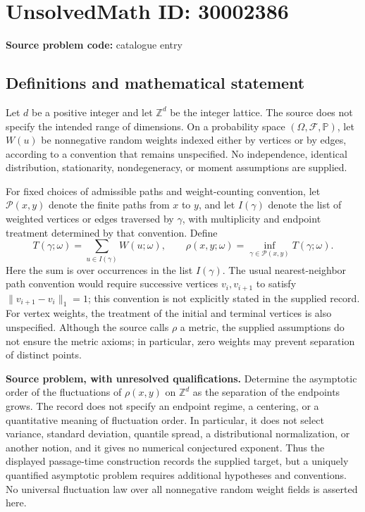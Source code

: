\documentclass[11pt]{article}
\newcommand{\Z}{\mathbb{Z}}
\begin{document}
\section*{UnsolvedMath ID: 30002386}
\textbf{Source problem code:} catalogue entry
\subsection{Definitions and mathematical statement}
Let \(d\) be a positive integer and let \(\Z^d\) be the integer lattice. The source does not specify the intended range of dimensions. On a probability space \((\Omega,\mathcal F,\mathbb P)\), let \(W(u)\) be nonnegative random weights indexed either by vertices or by edges, according to a convention that remains unspecified. No independence, identical distribution, stationarity, nondegeneracy, or moment assumptions are supplied.

For fixed choices of admissible paths and weight-counting convention, let \(\mathcal P(x,y)\) denote the finite paths from \(x\) to \(y\), and let \(I(\gamma)\) denote the list of weighted vertices or edges traversed by \(\gamma\), with multiplicity and endpoint treatment determined by that convention. Define
\[
T(\gamma;\omega)=\sum_{u\in I(\gamma)}W(u;\omega),
\qquad
\rho(x,y;\omega)=\inf_{\gamma\in\mathcal P(x,y)}T(\gamma;\omega).
\]
Here the sum is over occurrences in the list \(I(\gamma)\). The usual nearest-neighbor path convention would require successive vertices \(v_i,v_{i+1}\) to satisfy \(\|v_{i+1}-v_i\|_1=1\); this convention is not explicitly stated in the supplied record. For vertex weights, the treatment of the initial and terminal vertices is also unspecified. Although the source calls \(\rho\) a metric, the supplied assumptions do not ensure the metric axioms; in particular, zero weights may prevent separation of distinct points.

\textbf{Source problem, with unresolved qualifications.} Determine the asymptotic order of the fluctuations of \(\rho(x,y)\) on \(\Z^d\) as the separation of the endpoints grows. The record does not specify an endpoint regime, a centering, or a quantitative meaning of fluctuation order. In particular, it does not select variance, standard deviation, quantile spread, a distributional normalization, or another notion, and it gives no numerical conjectured exponent. Thus the displayed passage-time construction records the supplied target, but a uniquely quantified asymptotic problem requires additional hypotheses and conventions. No universal fluctuation law over all nonnegative random weight fields is asserted here.
\end{document}
